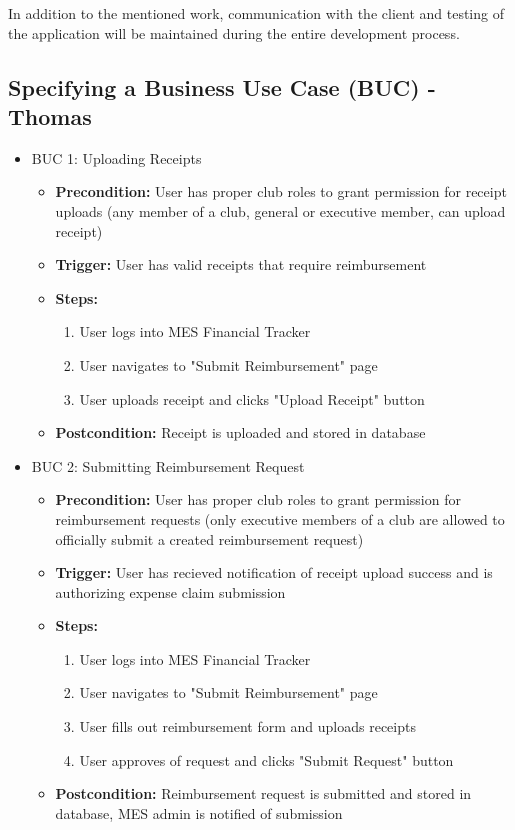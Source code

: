 \documentclass[12pt]{article}
\begin{document}
    In addition to the mentioned work, communication with the client and testing of the application will be maintained during the entire development process.
  \subsection{Specifying a Business Use Case (BUC) - Thomas}
  \begin{itemize}
    \item BUC 1: Uploading Receipts
      \begin{itemize}
        \item \textbf{Precondition:} User has proper club roles to grant permission for receipt uploads (any member of a club, general or executive member, can upload receipt)
        \item \textbf{Trigger:} User has valid receipts that require reimbursement
        \item \textbf{Steps:}
          \begin{enumerate}
            \item User logs into MES Financial Tracker
            \item User navigates to "Submit Reimbursement" page
            \item User uploads receipt and clicks "Upload Receipt" button
          \end{enumerate}
        \item \textbf{Postcondition:} Receipt is uploaded and stored in database
      \end{itemize}

    \item BUC 2: Submitting Reimbursement Request 
      \begin{itemize}
        \item \textbf{Precondition:} User has proper club roles to grant permission for reimbursement requests (only executive members of a club are allowed to officially submit a created reimbursement request)
        \item \textbf{Trigger:} User has recieved notification of receipt upload success and is authorizing expense claim submission
        \item \textbf{Steps:}
          \begin{enumerate}
            \item User logs into MES Financial Tracker
            \item User navigates to "Submit Reimbursement" page
            \item User fills out reimbursement form and uploads receipts 
            \item User approves of request and clicks "Submit Request" button
          \end{enumerate}
        \item \textbf{Postcondition:} Reimbursement request is submitted and stored in database, MES admin is notified of submission 
      \end{itemize}


\end{itemize}
\end{document}
